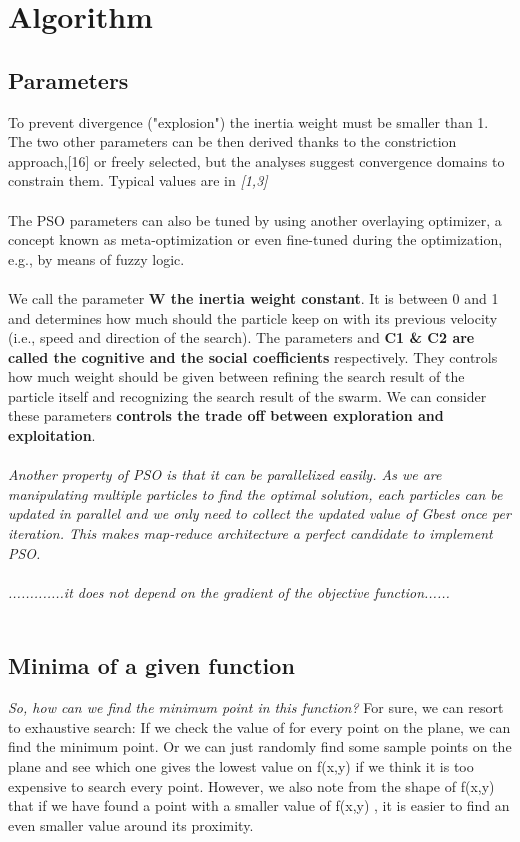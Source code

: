 \documentclass[12pt]{report}
\begin{document}
\section{Algorithm}

\subsection{Parameters}
To prevent divergence ("explosion") the inertia weight must be smaller than 1. The two other parameters can be then derived thanks to the constriction approach,[16] or freely selected, but the analyses suggest convergence domains to constrain them. Typical values are in 
\textit{[1,3]}
\\
\\The PSO parameters can also be tuned by using another overlaying optimizer, a concept known as meta-optimization or even fine-tuned during the optimization, e.g., by means of fuzzy logic.\\ \\
We call the parameter\textbf{ W the inertia weight constant}. It is between 0 and 1 and determines how much should the particle keep on with its previous velocity (i.e., speed and direction of the search). The parameters and \textbf{C1 \& C2 are called the cognitive and the social coefficients} respectively. They controls how much weight should be given between refining the search result of the particle itself and recognizing the search result of the swarm. We can consider these parameters \textbf{controls the trade off between exploration and exploitation}.\\ \\
\textit{Another property of PSO is that it can be parallelized easily. As we are manipulating multiple particles to find the optimal solution, each particles can be updated in parallel and we only need to collect the updated value of Gbest once per iteration. This makes map-reduce architecture a perfect candidate to implement PSO.} \\ \\
\textit{.............it does not depend on the gradient of the objective function......}\\ \\
\subsection{Minima of a given function}
\textit{So, how can we find the minimum point in this function?} For sure, we can resort to exhaustive search: If we check the value of 
 for every point on the plane, we can find the minimum point. Or we can just randomly find some sample points on the plane and see which one gives the lowest value on f(x,y)
 if we think it is too expensive to search every point. However, we also note from the shape of f(x,y)
 that if we have found a point with a smaller value of f(x,y)
, it is easier to find an even smaller value around its proximity.
\end{document}
